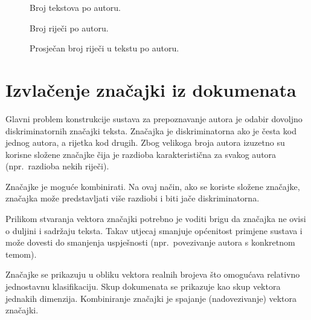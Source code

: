 \documentclass{article}
\begin{document}
\begin{figure}[htb]
\begin{center}

\end{center}
\caption{Broj tekstova po autoru.}
\label{fig:articlesPerAuthor}
\end{figure}

\begin{figure}[htb]
\begin{center}

\end{center}
\caption{Broj riječi po autoru.}
\label{fig:wordsPerAuthor}
\end{figure}

\begin{figure}[htb]
\begin{center}

\end{center}
\caption{Prosječan broj riječi u tekstu po autoru.}
\label{fig:avgWordsPerAuthorArticle}
\end{figure}

\section{Izvlačenje značajki iz dokumenata}
Glavni problem konstrukcije sustava za prepoznavanje autora je odabir dovoljno
diskriminatornih značajki teksta. Značajka je diskriminatorna ako je česta kod
jednog autora, a rijetka kod drugih. Zbog velikoga broja autora izuzetno su
korisne složene značajke čija je razdioba karakteristična za svakog autora
(npr.~razdioba nekih riječi).

Značajke je moguće kombinirati. Na ovaj način, ako se koriste složene značajke,
značajka može predstavljati više razdiobi i biti jače diskriminatorna.

Prilikom stvaranja vektora značajki potrebno je voditi brigu da značajka ne
ovisi o duljini i sadržaju teksta. Takav utjecaj smanjuje općenitost primjene
sustava i može dovesti do smanjenja uspješnosti (npr.~povezivanje autora s
konkretnom temom).

Značajke se prikazuju u obliku vektora realnih brojeva što omogućava relativno
jednostavnu klasifikaciju. Skup dokumenata se prikazuje kao skup vektora jednakih
dimenzija. Kombiniranje značajki je spajanje (nadovezivanje) vektora značajki.

\end{document}
